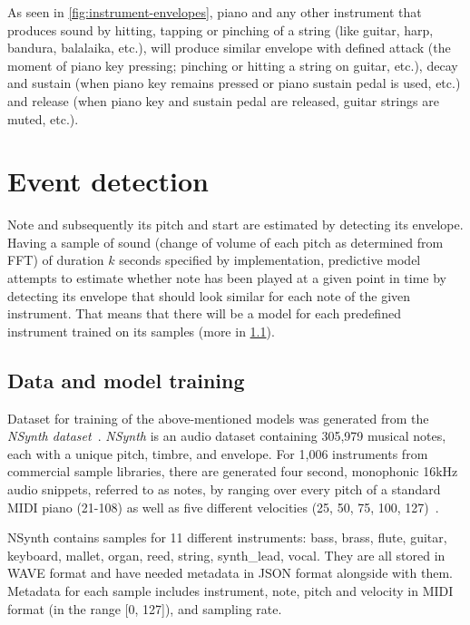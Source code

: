 
As seen in \cref{fig:instrument-envelopes}, piano and any other instrument that produces sound by hitting, tapping
or pinching of a string (like guitar, harp, bandura, balalaika, etc.), will produce similar envelope with defined
attack (the moment of piano key pressing; pinching or hitting a string on guitar, etc.), decay and sustain (when piano
key remains pressed or piano sustain pedal is used, etc.) and release (when piano key and sustain pedal are released,
guitar strings are muted, etc.).


\section{Event detection}\label{sec:event-detection}

Note and subsequently its pitch and start are estimated by detecting its envelope. Having a sample of sound (change of
volume of each pitch as determined from \ac{FFT}) of duration $k$ seconds specified by implementation, predictive model
attempts to estimate whether note has been played at a given point in time by detecting its envelope that should look
similar for each note of the given instrument. That means that there will be a model for each predefined instrument
trained on its samples (more in \cref{subsec:data-and-model-training}).

\subsection{Data and model training}\label{subsec:data-and-model-training}
Dataset for training of the above-mentioned models was generated from the \textit{NSynth dataset}~\cite{nsynth2017}.
\textit{NSynth} is an audio dataset containing 305,979 musical notes, each with a unique pitch, timbre, and envelope.
For 1,006 instruments from commercial sample libraries, there are generated four second, monophonic 16kHz audio
snippets, referred to as notes, by ranging over every pitch of a standard MIDI piano (21-108) as well as five different
velocities (25, 50, 75, 100, 127)~\cite{nsynth2017}.

NSynth contains samples for 11 different instruments: bass, brass, flute, guitar, keyboard, mallet, organ, reed,
string, synth\_lead, vocal. They are all stored in \ac{WAVE} format and have needed metadata in JSON format alongside
with them. Metadata for each sample includes instrument, note, pitch and velocity in \ac{MIDI} format (in the range
[0, 127]), and sampling rate.

